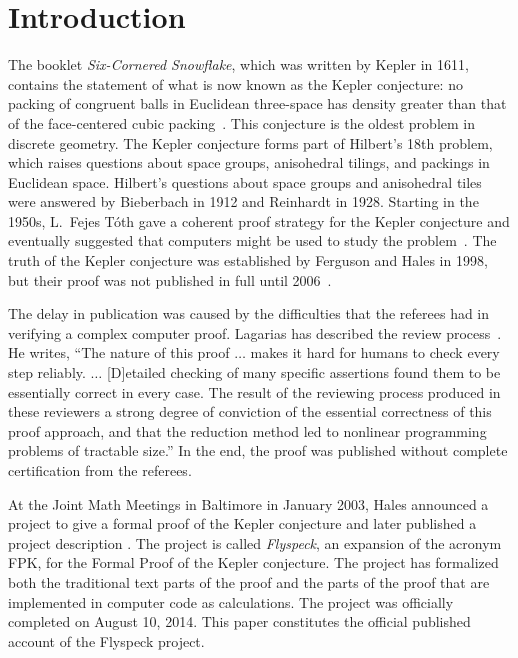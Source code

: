 
\newcommand{\R}{\mathbb{R}}
\newcommand{\IR}{\mathbb{IR}}
\newcommand{\Arctan}{\mathop{\rm Arctan}}
\newcommand{\abss}[1]{\lvert#1\rvert}
\newcommand{\iabs}{\mathop{\rm iabs}}
\newcommand{\bx}{{\bf x}}
\newcommand{\GT}{G_{\hbox{\tiny Taylor}}}
\baselineskip




\section{Introduction}


The booklet {\it Six-Cornered Snowflake}, which was written by Kepler
in 1611, contains the statement of what is now known as the Kepler
conjecture: no packing of congruent balls in Euclidean three-space has
density greater than that of the face-centered cubic
packing~\cite{Kepler11}.  This conjecture is the oldest problem in
discrete geometry. The Kepler conjecture forms part of Hilbert's 18th
problem, which raises questions about space groups, anisohedral
tilings, and packings in Euclidean space.  Hilbert's questions about
space groups and anisohedral tiles were answered by Bieberbach in 1912
and Reinhardt in 1928. Starting in the 1950s, L.\ Fejes T\'oth gave a
coherent proof strategy for the Kepler conjecture and eventually
suggested that computers might be used to study the
problem~\cite{Fej53}.  The truth of the Kepler conjecture was
established by Ferguson and Hales in 1998, but their proof was not
published in full until 2006~\cite{Hales:2006:DCG}.

The delay in publication was caused by the difficulties that the
referees had in verifying a complex computer proof.  Lagarias has
described the review process~\cite{LagKC}.  He writes, ``The nature of
this proof $\ldots$ makes it hard for humans to check every step
reliably. $\ldots$ [D]etailed checking of many specific assertions
found them to be essentially correct in every case.  The result of the
reviewing process produced in these reviewers a strong degree of
conviction of the essential correctness of this proof approach, and
that the reduction method led to nonlinear programming problems of
tractable size.''  In the end, the proof was published without
complete certification from the referees.

At the Joint Math Meetings in Baltimore in January 2003, Hales announced a
project to give a formal proof of the Kepler conjecture and later
published a project description \cite{hales:DSP:2006:432}.
The project is called {\it Flyspeck}, an expansion of the acronym
FPK, for the Formal Proof of the Kepler conjecture.  The project has
formalized both the traditional text parts of the proof and the
parts of the proof that are implemented in computer code as
calculations.  The project was officially completed on August 10, 2014.
This paper constitutes the official published account
of the Flyspeck project.  

